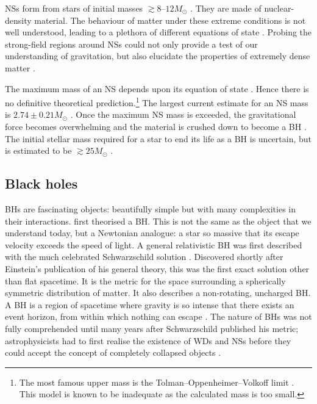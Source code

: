 NSs form from stars of initial masses $\gtrsim 8$--$12 M_\odot$ \citep{Woosley2002,Poelarends2008,Langer2012}. They are made of nuclear-density material. The behaviour of matter under these extreme conditions is not well understood, leading to a plethora of different equations of state \citep{Lattimer2012}. Probing the strong-field regions around NSs could not only provide a test of our understanding of gravitation, but also elucidate the properties of extremely dense matter \citep[e.g.,][]{Read2009,Ozel2009,Lackey2012}.

The maximum mass of an NS depends upon its equation of state \citep[section 9.3]{Shapiro1983}. Hence there is no definitive theoretical prediction.\footnote{The most famous upper mass is the Tolman--Oppenheimer--Volkoff limit \citep{Tolman1939,Oppenheimer1939}. This model is known to be inadequate as the calculated mass is too small.} The largest current estimate for an NS mass is $2.74 \pm 0.21 M_\odot$ \citep{Freire2008,Ozel2012}. Once the maximum NS mass is exceeded, the gravitational force becomes overwhelming and the material is crushed down to become a BH \citep[section 12.1]{Shapiro1983}. The initial stellar mass required for a star to end its life as a BH is uncertain, but is estimated to be $\gtrsim 25 M_\odot$ \citep{Woosley2002,Tauris2011}.

\subsection{Black holes}

BHs are fascinating objects: beautifully simple but with many complexities in their interactions. \citet{Michell1784} first theorised a BH. This is not the same as the object that we understand today, but a Newtonian analogue: a star so massive that its escape velocity exceeds the speed of light. A general relativistic BH was first described with the much celebrated Schwarzschild solution \citep{Schwarzschild1916}. Discovered shortly after Einstein's publication of his general theory, this was the first exact solution other than flat spacetime. It is the metric for the space surrounding a spherically symmetric distribution of matter. It also describes a non-rotating, uncharged BH. A BH is a region of spacetime where gravity is so intense that there exists an event horizon, from within which nothing can escape \citep[section 33.1]{Misner1973}. The nature of BHs was not fully comprehended until many years after Schwarzschild published his metric; astrophysicists had to first realise the existence of WDs and NSs before they could accept the concept of completely collapsed objects \citep{Israel1987}.

